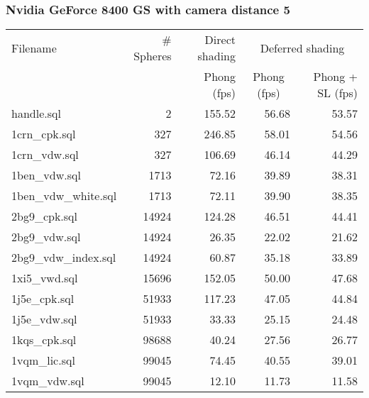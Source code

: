 \subsubsection*{Nvidia GeForce 8400 GS with camera distance 5}
\begin{tabular}{|l|r|r|r|r|}
\hline
Filename & \# Spheres & Direct shading & \multicolumn{2}{|c|}{Deferred shading} \\
         &            & Phong (fps)    & \multicolumn{1}{|c}{Phong (fps)} & Phong + SL (fps) \\  
\hline
\hline
handle.sql & 2 & 155.52 & 56.68 & 53.57 \\
\hline
1crn\_cpk.sql & 327 & 246.85 & 58.01 & 54.56 \\
\hline
1crn\_vdw.sql & 327 & 106.69 & 46.14 & 44.29 \\
\hline
1ben\_vdw.sql & 1713 & 72.16 & 39.89 & 38.31 \\
\hline
1ben\_vdw\_white.sql & 1713 & 72.11 & 39.90 & 38.35 \\
\hline
2bg9\_cpk.sql & 14924 & 124.28 & 46.51 & 44.41 \\
\hline
2bg9\_vdw.sql & 14924 & 26.35 & 22.02 & 21.62 \\
\hline
2bg9\_vdw\_index.sql & 14924 & 60.87 & 35.18 & 33.89 \\
\hline
1xi5\_vwd.sql & 15696 & 152.05 & 50.00 & 47.68 \\
\hline
1j5e\_cpk.sql & 51933 & 117.23 & 47.05 & 44.84 \\
\hline
1j5e\_vdw.sql & 51933 & 33.33 & 25.15 & 24.48 \\
\hline
1kqs\_cpk.sql & 98688 & 40.24 & 27.56 & 26.77 \\
\hline
1vqm\_lic.sql & 99045 & 74.45 & 40.55 & 39.01 \\
\hline
1vqm\_vdw.sql & 99045 & 12.10 & 11.73 & 11.58 \\
\hline
\end{tabular}
